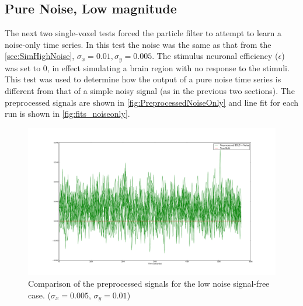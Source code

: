 \subsection{Pure Noise, Low magnitude}
\label{sec:PureNoiseLowMag}
The next two single-voxel tests forced the particle filter to attempt to learn a noise-only
time series. In this test the noise was the same as that from the \autoref{sec:SimHighNoise},
$\sigma_x = 0.01, \sigma_y = 0.005$. The stimulus neuronal efficiency ($\epsilon$) was set
to 0, in effect simulating a brain region with no response to the stimuli.
This test was used to determine how the output of a pure noise time series
is different from that of a simple noisy signal (as in the previous two sections).
The preprocessed signals are shown in \autoref{fig:PreprocessedNoiseOnly}
and line fit for each run is shown in \autoref{fig:fits_noiseonly}.


\begin{figure}[H]
\centering
\includegraphics[clip=true,trim=6cm 2cm 6cm 3.5cm,width=15cm]{images/preprocessed_noiseonly}
\caption[Preprocessed Signal for non-active, low noise signal]
{Comparison of the preprocessed signals for the low noise signal-free case.
 ($\sigma_x = 0.005$, $\sigma_y = 0.01$)}
\label{fig:PreprocessedNoiseOnly}
\end{figure}

